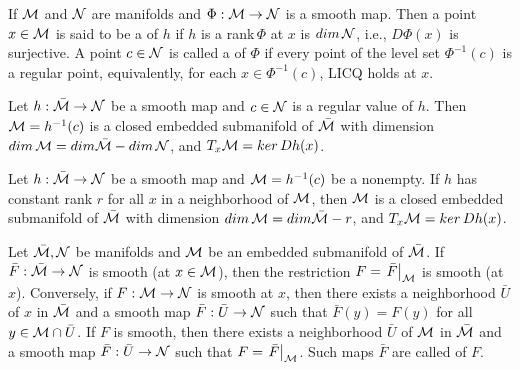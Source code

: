 \documentclass[11pt,a4paper]{article}
\begin{document}
\begin{definition}
If $\mathcal{M}$ and $\mathcal{N}$ are manifolds and $\Phi:\mathcal{M}\rightarrow \mathcal{N}$ is a smooth map. Then a point $x\in \mathcal{M}$ is said to be a  of $h$ if $h$ is a rank$\,\Phi$ at $x$ is $dim\,\mathcal{N}$, i.e., $D\Phi(x)$ is surjective. A point $c\in \mathcal{N}$ is called a  of $\Phi$ if every point of the level set $\Phi^{-1}(c)$ is a regular point, equivalently, for each $x\in \Phi^{-1}(c)$, LICQ holds at $x$.
\end{definition}

\begin{corollary} \label{prop:submersion_theorem}
Let $h:\bar{\mathcal{M}}\rightarrow \mathcal{N}$ be a smooth map and $c\in \mathcal{N}$ is a regular value of $h$. Then $\mathcal{M} = h^{-1}(c)$ is a closed embedded submanifold of $\bar{\mathcal{M}}$ with dimension $dim\,\mathcal{M}  = dim\bar{\mathcal{M}}-dim\,\mathcal{N}$, and $T_x\mathcal{M} = ker\,Dh(x)$.
\end{corollary}

\begin{corollary} 
Let $h:\bar{\mathcal{M}}\rightarrow \mathcal{N}$ be a smooth map and $\mathcal{M} = h^{-1}(c)$ be a nonempty. If $h$ has constant rank $r$ for all $x$ in a neighborhood of $\mathcal{M}$, then $\mathcal{M}$ is a closed embedded submanifold of $\bar{\mathcal{M}}$ with dimension $dim\,\mathcal{M}  = dim\bar{\mathcal{M}}-r$, and $T_x\mathcal{M} = ker\,Dh(x)$.
\end{corollary}


\begin{proposition}
Let $\bar{\mathcal{M}}, \mathcal{N}$ be manifolds and $\mathcal{M}$ be an embedded submanifold of $\bar{\mathcal{M}}$. If $\bar{F}:\bar{\mathcal{M}}\rightarrow \mathcal{N}$ is smooth (at $x\in \mathcal{M}$), then the restriction $F = \left.\bar{F}\right|_{\mathcal{M}}$ is smooth (at $x$). Conversely, if $F:\mathcal{M}\rightarrow \mathcal{N}$ is smooth at $x$, then there exists a neighborhood $\bar{U}$ of $x$ in $\bar{\mathcal{M}}$ and a smooth map $\bar{F}:\bar{U}\rightarrow \mathcal{N}$ such that $\bar{F}(y) = F(y)$ for all $y\in \mathcal{M}\cap \bar{U}$. If $F$ is smooth, then there exists a neighborhood $\bar{U}$ of $\mathcal{M}$ in $\bar{\mathcal{M}}$ and a smooth map $\bar{F}:\bar{U}\rightarrow \mathcal{N}$ such that $F = \left.\bar{F}\right|_{\mathcal{M}}$. Such maps $\bar{F}$ are called  of $F$.
\end{proposition}
\end{document}
